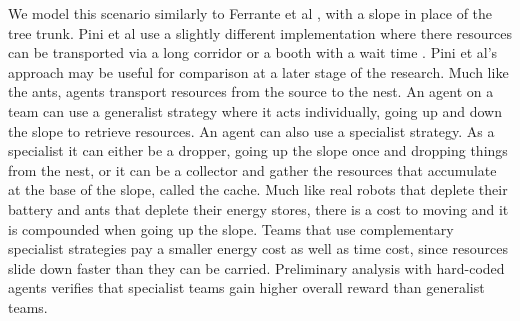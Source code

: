 \documentclass[12pt]{article}
\begin{document}
We model this scenario similarly to Ferrante et al \cite{ferrante:PLOS_CB:2015}, with a slope in place of the tree trunk. 
Pini et al use a slightly different implementation where there resources can be transported via a long corridor or a booth with a wait time \cite{pini:ICSI:2012, pini:Swarm_Intelligence:2011}. 
Pini et al's approach may be useful for comparison at a later stage of the research.
Much like the ants, agents transport resources from the source to the nest.
An agent on a team can use a generalist strategy where it acts individually, going up and down the slope to retrieve resources.
An agent can also use a specialist strategy. 
As a specialist it can either be a dropper, going up the slope once and dropping things from the nest, or it can be a collector and gather the resources that accumulate at the base of the slope, called the cache.
Much like real robots that deplete their battery and ants that deplete their energy stores, there is a cost to moving and it is compounded when going up the slope. 
Teams that use complementary specialist strategies pay a smaller energy cost as well as time cost, since resources slide down faster than they can be carried. 
Preliminary analysis with hard-coded agents verifies that specialist teams gain higher overall reward than generalist teams.\\
\end{document}
